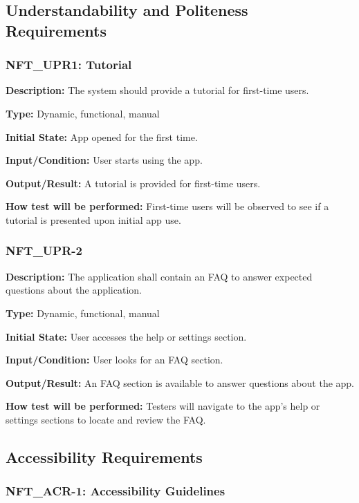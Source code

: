 \documentclass[12pt, titlepage]{article}
\begin{document}
\subsection{Understandability and Politeness Requirements}


\subsubsection*{\textbf{NFT\_UPR1: Tutorial}
}

\textbf{Description: }The system should provide a tutorial for first-time users. 

\textbf{Type:} Dynamic, functional, manual

\textbf{Initial State:} App opened for the first time.

\textbf{Input/Condition: }User starts using the app.

\textbf{Output/Result: }A tutorial is provided for first-time users.

\textbf{How test will be performed: }First-time users will be observed to see if a tutorial is presented upon initial app use.


\subsubsection*{\textbf{NFT\_UPR-2}
}

\textbf{Description: }The application shall contain an FAQ to answer expected questions about the application.

\textbf{Type: }Dynamic, functional, manual

\textbf{Initial State:} User accesses the help or settings section.

\textbf{Input/Condition:} User looks for an FAQ section.

\textbf{Output/Result: }An FAQ section is available to answer questions about the app.

\textbf{How test will be performed: }Testers will navigate to the app's help or settings sections to locate and review the FAQ.
\newline
\subsection{Accessibility Requirements}


\subsubsection*{\textbf{NFT\_ACR-1: }Accessibility Guidelines}
\end{document}
